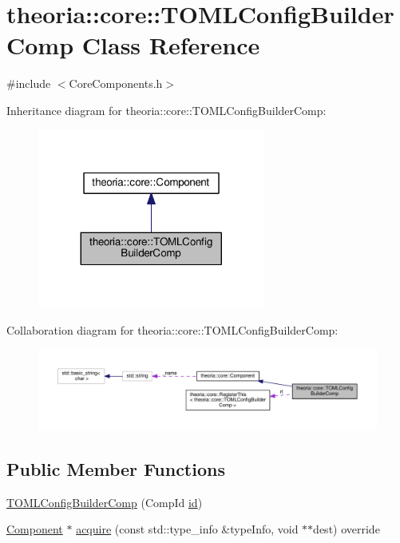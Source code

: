 \hypertarget{classtheoria_1_1core_1_1TOMLConfigBuilderComp}{}\section{theoria\+:\+:core\+:\+:T\+O\+M\+L\+Config\+Builder\+Comp Class Reference}
\label{classtheoria_1_1core_1_1TOMLConfigBuilderComp}


{\ttfamily \#include $<$Core\+Components.\+h$>$}



Inheritance diagram for theoria\+:\+:core\+:\+:T\+O\+M\+L\+Config\+Builder\+Comp\+:\nopagebreak
\begin{figure}[H]
\begin{center}
\leavevmode
\includegraphics[width=212pt]{classtheoria_1_1core_1_1TOMLConfigBuilderComp__inherit__graph}
\end{center}
\end{figure}


Collaboration diagram for theoria\+:\+:core\+:\+:T\+O\+M\+L\+Config\+Builder\+Comp\+:\nopagebreak
\begin{figure}[H]
\begin{center}
\leavevmode
\includegraphics[width=350pt]{classtheoria_1_1core_1_1TOMLConfigBuilderComp__coll__graph}
\end{center}
\end{figure}
\subsection*{Public Member Functions}
\begin{DoxyCompactItemize}
\item 
\hyperlink{classtheoria_1_1core_1_1TOMLConfigBuilderComp_a7944116685d64329a987f6dd3f0f8f17}{T\+O\+M\+L\+Config\+Builder\+Comp} (Comp\+Id \hyperlink{classtheoria_1_1core_1_1Component_ab539df9f996efceda7743fa1b69cd25d}{id})
\item 
\hyperlink{classtheoria_1_1core_1_1Component}{Component} $\ast$ \hyperlink{classtheoria_1_1core_1_1TOMLConfigBuilderComp_a7cfce41f96c49af8e80d884f70ee66fa}{acquire} (const std\+::type\+\_\+info \&type\+Info, void $\ast$$\ast$dest) override
\end{DoxyCompactItemize}
